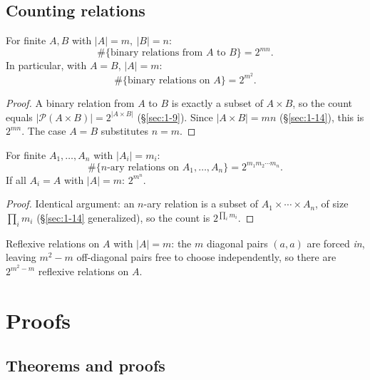 \documentclass[11pt]{article}
\begin{document}
\subsection{Counting relations}
\label{sec:2-18}

\begin{theorem}
For finite $A,B$ with $|A|=m,\ |B|=n$:
\[
\#\{\text{binary relations from } A \text{ to } B\} = 2^{mn}.
\]
In particular, with $A=B$, $|A|=m$:
\[
\#\{\text{binary relations on } A\} = 2^{m^2}.
\]
\end{theorem}
\begin{proof}
A binary relation from $A$ to $B$ is exactly a subset of $A \times B$, so the count equals $|\mathcal{P}(A\times B)| = 2^{|A\times B|}$ (\S\ref{sec:1-9}). Since $|A\times B| = mn$ (\S\ref{sec:1-14}), this is $2^{mn}$. The case $A=B$ substitutes $n=m$.
\end{proof}

\begin{theorem}
For finite $A_1,\dots,A_n$ with $|A_i|=m_i$:
\[
\#\{n\text{-ary relations on } A_1,\dots,A_n\} = 2^{m_1 m_2 \cdots m_n}.
\]
If all $A_i = A$ with $|A|=m$: $2^{m^n}$.
\end{theorem}
\begin{proof}
Identical argument: an $n$-ary relation is a subset of $A_1\times\cdots\times A_n$, of size $\prod_i m_i$ (\S\ref{sec:1-14} generalized), so the count is $2^{\prod_i m_i}$.
\end{proof}

\begin{example}
Reflexive relations on $A$ with $|A|=m$: the $m$ diagonal pairs $(a,a)$ are forced \emph{in}, leaving $m^2 - m$ off-diagonal pairs free to choose independently, so there are $2^{m^2-m}$ reflexive relations on $A$.
\end{example}

\newpage
\section{Proofs}

\subsection{Theorems and proofs}
\label{sec:3-1}
\end{document}
